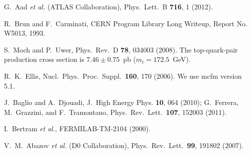 \documentclass[aps,prl,twocolumn,showpacs,superscriptaddress,groupedaddress]{revtex4}  %
\newcommand{\mcfm}      {\sc mcfm}
\begin{document}
\begin{thebibliography}{99}
  G.~Aad {\it et al.}  (ATLAS Collaboration),
  Phys.\ Lett.\ B {\bf 716}, 1 (2012).

  R.~Brun and F.~Carminati,
  CERN Program Library Long Writeup, Report No. W5013, 1993.

  S.~Moch and P.~Uwer,
  Phys.\ Rev.\ D {\bf 78}, 034003 (2008). 
  The top-quark-pair production cross section is $7.46 \pm 0.75$~pb
  ($m_t=172.5$~GeV). 

  R.~K.~Ellis,
  Nucl.\ Phys.\ Proc.\ Suppl.\ {\bf 160}, 170 (2006). We use {\mcfm}
  version 5.1.

  J.~Baglio and A.~Djouadi,
  J.\ High Energy Phys. {\bf 10}, 064 (2010);
  G.~Ferrera, M.~Grazzini, and F.~Tramontano,
  Phys.\ Rev.\ Lett.\  {\bf 107}, 152003 (2011).

  I.~Bertram {\it et al.}, FERMILAB-TM-2104 (2000).

V.~M.~Abazov {\it et al.} (D0 Collaboration),
Phys.\ Rev.\ Lett.\ {\bf 99}, 191802 (2007).



\end{thebibliography}
\end{document}
